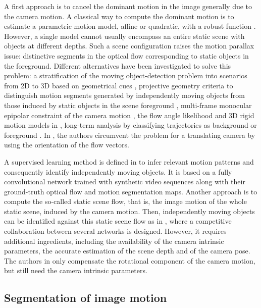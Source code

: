 \documentclass[10pt,twocolumn,letterpaper]{article}
\begin{document}
A first approach is to cancel the dominant motion in the image generally due to the camera motion. A classical way to compute the dominant motion is to estimate a parametric motion model, affine or quadratic, with a robust function \cite{odobez_robust_1995}. However, a single model cannot usually encompass an entire static scene with objects at different depths. Such a scene configuration raises the motion parallax issue: distinctive segments in the optical flow corresponding to static objects in the foreground.
Different alternatives have been investigated to solve this problem: a stratification of the moving object-detection problem into scenarios from 2D to 3D based on geometrical cues \cite{irani1998}, projective geometry criteria to distinguish motion segments generated by independently moving objects from those induced by static objects in the scene foreground \cite{csurka1999}, multi-frame monocular epipolar constraint of the camera motion \cite{dey2012}, the flow angle likelihood and 3D rigid motion models in \cite{bideau-moving-2016}, long-term analysis by classifying trajectories as background or foreground \cite{wehrwein_video_2017}. In \cite{narayana_complex_2013}, the authors circumvent the problem for a translating camera by using the orientation of the flow vectors.

A supervised learning method is defined in \cite{tokmakov_learning_2017} to infer relevant motion patterns and consequently identify independently moving objects. It is based on a fully convolutional network trained with synthetic video sequences along with their ground-truth optical flow and motion segmentation maps.
Another approach is to compute the so-called static scene flow, that is, the image motion of the whole static scene, induced by the camera motion. Then, independently moving objects can be identified against this static scene flow as in \cite{ranjan_competitive_2019}, where a competitive collaboration between several networks is designed. However, it requires additional ingredients, including the availability of the camera intrinsic parameters, the accurate estimation of the scene depth and of the camera pose. The authors in \cite{bideau_moa-net_2018} only compensate the rotational component of the camera motion, but still need the camera intrinsic parameters.

\subsection{Segmentation of image motion}
\end{document}
